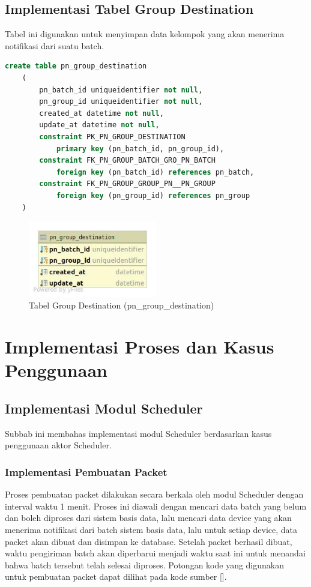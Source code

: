 \subsection{Implementasi Tabel Group Destination}
\par Tabel ini digunakan untuk menyimpan data kelompok yang akan menerima notifikasi dari suatu batch.
\begin{lstlisting}[language=sql, firstnumber=1, caption=Implementasi Tabel Group Destination]
    create table pn_group_destination
    (
        pn_batch_id uniqueidentifier not null,
        pn_group_id uniqueidentifier not null,
        created_at datetime not null,
        update_at datetime not null,
        constraint PK_PN_GROUP_DESTINATION
            primary key (pn_batch_id, pn_group_id),
        constraint FK_PN_GROUP_BATCH_GRO_PN_BATCH
            foreign key (pn_batch_id) references pn_batch,
        constraint FK_PN_GROUP_GROUP_PN__PN_GROUP
            foreign key (pn_group_id) references pn_group
    )
\end{lstlisting}
\begin{figure}[H]
    \centering\includegraphics[width=0.5\textwidth]{bab4/figures/tabel_pn_group_destination.jpg}
    \caption{Tabel Group Destination (pn\_group\_destination)}
    \label{tabel_pn_group_destination}
\end{figure}

\section{Implementasi Proses dan Kasus Penggunaan}

\subsection{Implementasi Modul Scheduler}
\par Subbab ini membahas implementasi modul Scheduler berdasarkan kasus penggunaan aktor Scheduler.

\subsubsection{Implementasi Pembuatan Packet}
\par Proses pembuatan packet dilakukan secara berkala oleh modul Scheduler dengan interval waktu 1 menit.
Proses ini diawali dengan mencari data batch yang belum dan boleh diproses dari sistem basis data,
lalu mencari data device yang akan menerima notifikasi dari batch sistem basis data,
lalu untuk setiap device, data packet akan dibuat dan disimpan ke database.
Setelah packet berhasil dibuat, waktu pengiriman batch akan diperbarui menjadi waktu saat ini untuk menandai bahwa
batch tersebut telah selesai diproses.
Potongan kode yang digunakan untuk pembuatan packet dapat dilihat pada kode sumber [].
